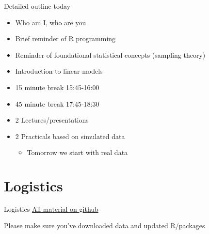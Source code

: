 \documentclass[
  ignorenonframetext,
]{beamer}
\providecommand{\tightlist}{%
  \setlength{\itemsep}{0pt}\setlength{\parskip}{0pt}}
\begin{document}
\begin{frame}{Detailed outline today}
\protect\hypertarget{detailed-outline-today}{}
\begin{itemize}
\item
  Who am I, who are you
\item
  Brief reminder of R programming
\item
  Reminder of foundational statistical concepts (sampling theory)
\item
  Introduction to linear models
\item
  15 minute break 15:45-16:00
\item
  45 minute break 17:45-18:30
\item
  2 Lectures/presentations
\item
  2 Practicals based on simulated data

  \begin{itemize}
  \tightlist
  \item
    Tomorrow we start with real data
  \end{itemize}
\end{itemize}
\end{frame}

\hypertarget{logistics}{%
\section{Logistics}\label{logistics}}

\begin{frame}{Logistics}
\href{https://github.com/BertvanderVeen/GLM-workshop}{All material on
github}

Please make sure you've downloaded data and updated R/packages
\end{frame}
\end{document}
